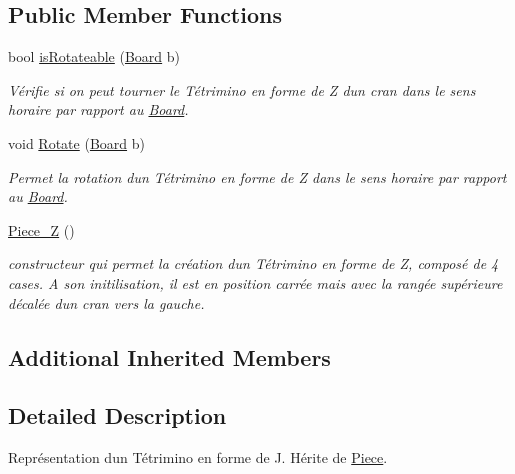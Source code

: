 \subsection*{Public Member Functions}
\begin{DoxyCompactItemize}
\item 
bool \hyperlink{classPiece__Z_aa70256d6f49dacad685a15c5ae8df06d}{is\+Rotateable} (\hyperlink{classBoard}{Board} b)
\begin{DoxyCompactList}\small\item\em Vérifie si on peut tourner le Tétrimino en forme de Z d\textquotesingle{}un cran dans le sens horaire par rapport au \hyperlink{classBoard}{Board}. \end{DoxyCompactList}\item 
void \hyperlink{classPiece__Z_a50d6c34030c7641b4827353b9b82a68e}{Rotate} (\hyperlink{classBoard}{Board} b)
\begin{DoxyCompactList}\small\item\em Permet la rotation d\textquotesingle{}un Tétrimino en forme de Z dans le sens horaire par rapport au \hyperlink{classBoard}{Board}. \end{DoxyCompactList}\item 
\mbox{\label{classPiece__Z_aecae5333fb48fae61d1b572b3282fc09}} 
\hyperlink{classPiece__Z_aecae5333fb48fae61d1b572b3282fc09}{Piece\+\_\+Z} ()
\begin{DoxyCompactList}\small\item\em constructeur qui permet la création d\textquotesingle{}un Tétrimino en forme de Z, composé de 4 cases. A son initilisation, il est en position carrée mais avec la rangée supérieure décalée d\textquotesingle{}un cran vers la gauche. \end{DoxyCompactList}\end{DoxyCompactItemize}
\subsection*{Additional Inherited Members}


\subsection{Detailed Description}
Représentation d\textquotesingle{}un Tétrimino en forme de J. Hérite de \hyperlink{classPiece}{Piece}. 

